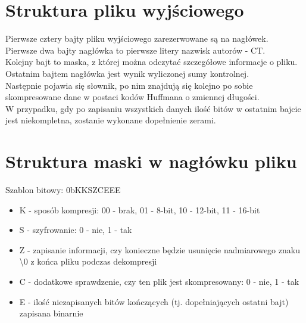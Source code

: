 \documentclass[]{article}
\begin{document}
\section{Struktura pliku wyjściowego}\label{header-n279}
Pierwsze cztery bajty pliku wyjściowego zarezerwowane są na nagłówek. \\
Pierwsze dwa bajty nagłówka to pierwsze litery nazwisk autorów - CT.\\
Kolejny bajt to maska, z której można odczytać szczegółowe informacje o pliku. Ostatnim bajtem nagłówka jest wynik wyliczonej sumy kontrolnej.\\
Następnie pojawia się słownik, po nim znajdują się kolejno po sobie skompresowane dane w postaci kodów Huffmana o zmiennej długości.\\
W przypadku, gdy po zapisaniu wszystkich danych ilość bitów w ostatnim bajcie jest niekompletna, zostanie wykonane dopełnienie zerami.
\section{Struktura maski w nagłówku pliku}\label{header-n279}

    Szablon bitowy: 0bKKSZCEEE
\begin{itemize}
    \item K - sposób kompresji: 00 - brak, 01 - 8-bit, 10 - 12-bit, 11 - 16-bit
   \item  S - szyfrowanie: 0 - nie, 1 - tak
   \item  Z - zapisanie informacji, czy konieczne będzie usunięcie nadmiarowego znaku \textbackslash0 z końca pliku podczas dekompresji
   \item  C - dodatkowe sprawdzenie, czy ten plik jest skompresowany: 0 - nie, 1 - tak
   \item  E - ilość niezapisanych bitów kończących (tj. dopełniających ostatni bajt) zapisana binarnie
\end{itemize}
\end{document}
